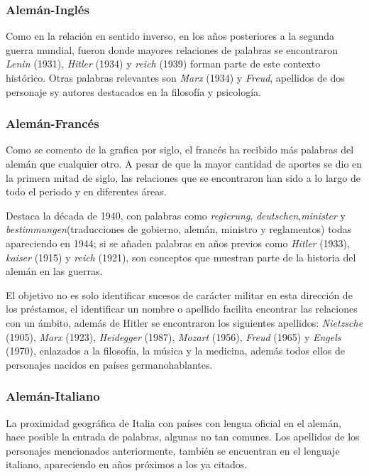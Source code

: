 {\subsubsection*{Alemán-Inglés}%

Como en la relación en sentido inverso, en los años posteriores a la segunda guerra mundial,  fueron donde mayores relaciones de palabras se encontraron  \textit{Lenin} (1931), \textit{Hitler} (1934) y \textit{reich} (1939) forman parte  de este contexto histórico.  Otras palabras relevantes son \textit{Marx} (1934) y \textit{Freud}, apellidos de dos personaje sy autores destacados en la filosofía y psicología. 


\subsubsection*{Alemán-Francés}%

Como se comento de la grafica por siglo, el francés ha recibido más palabras del alemán que cualquier otro. A pesar de que la mayor cantidad de aportes se dio en la primera mitad de siglo, las relaciones que se encontraron han sido a lo largo de todo el periodo y en diferentes áreas. 

Destaca la década de 1940, con palabras como \textit{regierung},  \textit{deutschen},\textit{minister} y  \textit{bestimmungen}(traducciones de gobierno, alemán, ministro y reglamentos) todas apareciendo en 1944;  si se añaden palabras en años previos como \textit{Hitler} (1933), \textit{kaiser} (1915) y \textit{reich} (1921), son conceptos que muestran parte de la historia del alemán en las guerras. 

El objetivo no es solo identificar sucesos de carácter militar en esta dirección de los préstamos, el identificar un nombre o apellido facilita encontrar las relaciones con un ámbito,  además de Hitler se encontraron los siguientes apellidos:  \textit{Nietzsche} (1905),  \textit{Marx} (1923), \textit{Heidegger} (1987),  \textit{Mozart} (1956), \textit{Freud} (1965) y \textit{Engels} (1970), enlazados a la filosofía, la música y la medicina,  además todos ellos de personajes nacidos en países germanohablantes.


\subsubsection*{Alemán-Italiano}%

La proximidad geográfica de Italia con países con lengua oficial en el alemán, hace posible la entrada de palabras, algunas no tan comunes.  Los apellidos de los personajes mencionados anteriormente, también se encuentran en el lenguaje italiano, apareciendo en años próximos a los ya citados.  

}
